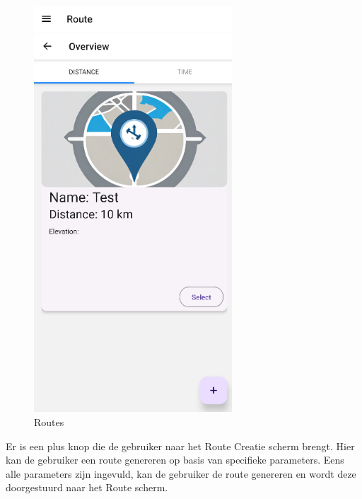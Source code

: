     \begin{figure}[H]
        \includegraphics[width=20em]{./graphics/routes.png}
        \centering
        \caption{Routes}
        \label{fig:routes}
    \end{figure}

    Er is een plus knop die de gebruiker naar het Route Creatie scherm brengt. Hier kan de gebruiker een route genereren op basis van specifieke parameters. Eens alle parameters zijn ingevuld, kan de gebruiker de route genereren en wordt deze doorgestuurd naar het Route scherm.

